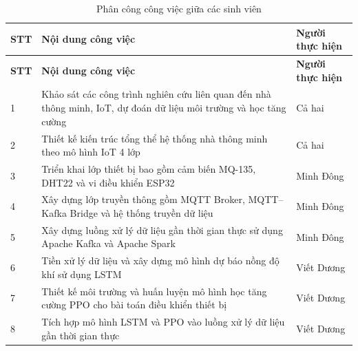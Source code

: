 \begingroup
\renewcommand{\arraystretch}{1.25}
\setlength{\tabcolsep}{3pt}

\setlength{\overfullrule}{0pt}

\setlength{\arrayrulewidth}{0.4pt}

\setlength{\LTleft}{0pt}
\setlength{\LTright}{0pt}

\begin{longtable}{
|>{\centering\arraybackslash}p{0.8cm}
|>{\raggedright\arraybackslash}p{\dimexpr\textwidth-0.8cm-2.6cm-6\tabcolsep-4\arrayrulewidth\relax}
|>{\centering\arraybackslash}p{2.6cm}|
}
\caption{Phân công công việc giữa các sinh viên}
\label{tab:task_assignment} \\
\hline
\textbf{STT} & \textbf{Nội dung công việc} & \textbf{Người thực hiện} \\
\hline
\endfirsthead

\hline
\textbf{STT} & \textbf{Nội dung công việc} & \textbf{Người thực hiện} \\
\hline
\endhead

1 & Khảo sát các công trình nghiên cứu liên quan đến nhà thông minh, IoT, dự đoán dữ liệu môi trường và học tăng cường & Cả hai \\
\hline

2 & Thiết kế kiến trúc tổng thể hệ thống nhà thông minh theo mô hình IoT 4 lớp & Cả hai \\
\hline

3 & Triển khai lớp thiết bị bao gồm cảm biến MQ-135, DHT22 và vi điều khiển ESP32 & Minh Đông \\
\hline

4 & Xây dựng lớp truyền thông gồm MQTT Broker, MQTT--Kafka Bridge và hệ thống truyền dữ liệu & Minh Đông \\
\hline

5 & Xây dựng luồng xử lý dữ liệu gần thời gian thực sử dụng Apache Kafka và Apache Spark & Minh Đông \\
\hline

6 & Tiền xử lý dữ liệu và xây dựng mô hình dự báo nồng độ khí sử dụng LSTM & Viết Dương \\
\hline

7 & Thiết kế môi trường và huấn luyện mô hình học tăng cường PPO cho bài toán điều khiển thiết bị & Viết Dương \\
\hline

8 & Tích hợp mô hình LSTM và PPO vào luồng xử lý dữ liệu gần thời gian thực & Viết Dương \\
\hline


\end{longtable}
